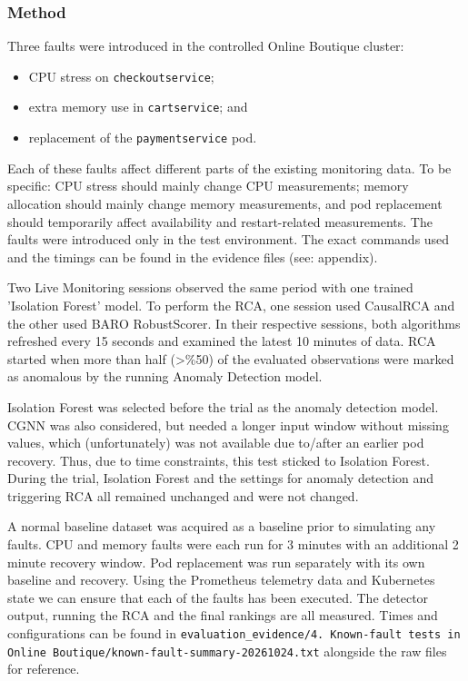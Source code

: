 \subsubsection{Method}

Three faults were introduced in the controlled Online Boutique cluster:
\begin{itemize}
    \item CPU stress on \texttt{checkoutservice};
    \item extra memory use in \texttt{cartservice}; and
    \item replacement of the \texttt{paymentservice} pod.
\end{itemize}

Each of these faults affect different parts of the existing monitoring data. To be specific: CPU stress should mainly change CPU measurements; memory allocation should mainly change memory measurements, and pod replacement should temporarily affect availability and restart-related measurements. The faults were introduced only in the test environment. The exact commands used and the timings can be found in the evidence files (see: appendix).

Two Live Monitoring sessions observed the same period with one trained 'Isolation Forest' model. To perform the RCA, one session used CausalRCA and the other used BARO RobustScorer. In their respective sessions, both algorithms refreshed every 15 seconds and examined the latest 10 minutes of data. RCA started when more than half (>\%50) of the evaluated observations were marked as anomalous by the running Anomaly Detection model.

Isolation Forest was selected before the trial as the anomaly detection model. CGNN was also considered, but needed a longer input window without missing values, which (unfortunately) was not available due to/after an earlier pod recovery. Thus, due to time constraints, this test sticked to Isolation Forest. During the trial, Isolation Forest and the settings for anomaly detection and triggering RCA all remained  unchanged and were not changed.

A normal baseline dataset was acquired as a baseline prior to simulating any faults. CPU and memory faults were each run for 3 minutes with an additional 2 minute recovery window. Pod replacement was run separately with its own baseline and recovery. Using the Prometheus telemetry data and Kubernetes state we can ensure that each of the faults has been executed. The detector output, running the RCA and the final rankings are all measured. Times and configurations can be found in \texttt{evaluation\_evidence/4. Known-fault tests in Online Boutique/known-fault-summary-20261024.txt} alongside the raw files for reference.

